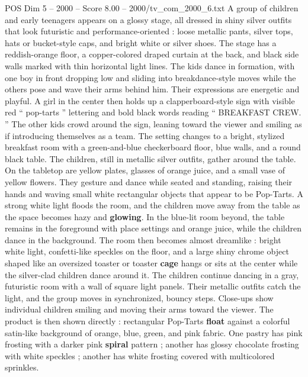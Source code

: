 \begin{textsample}{POS Dim 5 – 2000 – Score 8.00 – 2000/tv\_com\_2000\_6.txt}  \label{ex:f5_pos_026}
A group of children and early teenagers appears on a glossy stage, all dressed in shiny silver outfits that look futuristic and performance-oriented : loose metallic pants, silver tops, hats or bucket-style caps, and bright white or silver shoes.
The stage has a reddish-orange floor, a copper-colored draped curtain at the back, and black side walls marked with thin horizontal light lines.
The kids dance in formation, with one boy in front dropping low and sliding into breakdance-style moves while the others pose and wave their arms behind him.
Their expressions are energetic and playful.
A girl in the center then holds up a clapperboard-style sign with visible red “ pop-tarts ” lettering and bold black words reading “ BREAKFAST CREW. ” The other kids crowd around the sign, leaning toward the viewer and smiling as if introducing themselves as a team.
The setting changes to a bright, stylized breakfast room with a green-and-blue checkerboard floor, blue walls, and a round black table.
The children, still in metallic silver outfits, gather around the table.
On the tabletop are yellow plates, glasses of orange juice, and a small vase of yellow flowers.
They gesture and dance while seated and standing, raising their hands and waving small white rectangular objects that appear to be Pop-Tarts.
A strong white light floods the room, and the children move away from the table as the space becomes hazy and \textbf{glowing}.
In the blue-lit room beyond, the table remains in the foreground with place settings and orange juice, while the children dance in the background.
The room then becomes almost dreamlike : bright white light, confetti-like speckles on the floor, and a large shiny chrome object shaped like an oversized toaster or toaster \textbf{cage} hangs or sits at the center while the silver-clad children dance around it.
The children continue dancing in a gray, futuristic room with a wall of square light panels.
Their metallic outfits catch the light, and the group moves in synchronized, bouncy steps.
Close-ups show individual children smiling and moving their arms toward the viewer.
The product is then shown directly : rectangular Pop-Tarts \textbf{float} against a colorful satin-like background of orange, blue, green, and pink fabric.
One pastry has pink frosting with a darker pink \textbf{spiral} pattern ; another has glossy chocolate frosting with white speckles ; another has white frosting covered with multicolored sprinkles.

\end{textsample}
